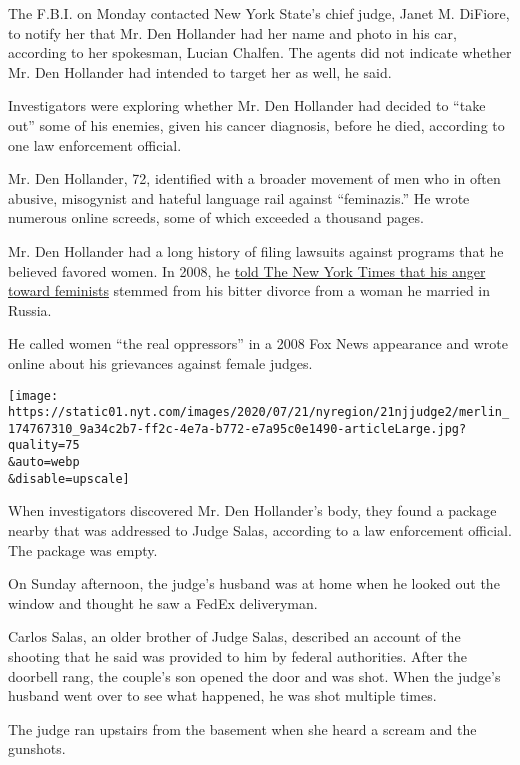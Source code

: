 The F.B.I. on Monday contacted New York State's chief judge, Janet M.
DiFiore, to notify her that Mr. Den Hollander had her name and photo in
his car, according to her spokesman, Lucian Chalfen. The agents did not
indicate whether Mr. Den Hollander had intended to target her as well,
he said.

Investigators were exploring whether Mr. Den Hollander had decided to
``take out'' some of his enemies, given his cancer diagnosis, before he
died, according to one law enforcement official.

Mr. Den Hollander, 72, identified with a broader movement of men who in
often abusive, misogynist and hateful language rail against
``feminazis.'' He wrote numerous online screeds, some of which exceeded
a thousand pages.

Mr. Den Hollander had a long history of filing lawsuits against programs
that he believed favored women. In 2008, he
\href{https://cityroom.blogs.nytimes.com/2008/08/18/lawyer-files-antifeminist-suit-against-columbia/\#:~:text=Roy\%20Den\%20Hollander\%20is\%20a,and\%20a\%20self\%2Ddescribed\%20antifeminist.\&text=On\%20Monday\%2C\%20he\%20filed\%20a,sees\%20as\%20discriminatory\%20toward\%20men}{told
The New York Times that his anger toward feminists} stemmed from his
bitter divorce from a woman he married in Russia.

He called women ``the real oppressors'' in a 2008 Fox News appearance
and wrote online about his grievances against female judges.

\texttt{[image: https://static01.nyt.com/images/2020/07/21/nyregion/21njjudge2/merlin\_174767310\_9a34c2b7-ff2c-4e7a-b772-e7a95c0e1490-articleLarge.jpg?quality=75\\\&auto=webp\\\&disable=upscale]}

When investigators discovered Mr. Den Hollander's body, they found a
package nearby that was addressed to Judge Salas, according to a law
enforcement official. The package was empty.

On Sunday afternoon, the judge's husband was at home when he looked out
the window and thought he saw a FedEx deliveryman.

Carlos Salas, an older brother of Judge Salas, described an account of
the shooting that he said was provided to him by federal authorities.
After the doorbell rang, the couple's son opened the door and was shot.
When the judge's husband went over to see what happened, he was shot
multiple times.

The judge ran upstairs from the basement when she heard a scream and the
gunshots.

